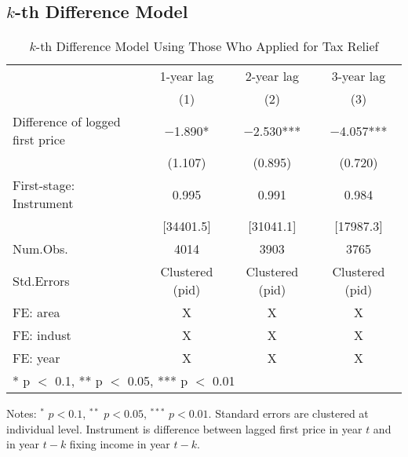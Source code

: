 \documentclass[
  11pt,
  a4paper,
]{article}
\begin{document}
\hypertarget{k-th-difference-model}{%
\subsection{\texorpdfstring{\(k\)-th Difference Model}{k-th Difference Model}}\label{k-th-difference-model}}

\begin{table}

\caption{\label{tab:KdiffElasticity}$k$-th Difference Model Using Those Who Applied for Tax Relief}
\centering
\fontsize{8}{10}\selectfont
\begin{threeparttable}
\begin{tabular}[t]{lccc}
\toprule
\multicolumn{1}{c}{ } & \multicolumn{1}{c}{1-year lag} & \multicolumn{1}{c}{2-year lag} & \multicolumn{1}{c}{3-year lag} \\
\cmidrule(l{3pt}r{3pt}){2-2} \cmidrule(l{3pt}r{3pt}){3-3} \cmidrule(l{3pt}r{3pt}){4-4}
  & (1) & (2) & (3)\\
\midrule
Difference of logged first price & \num{-1.890}* & \num{-2.530}*** & \num{-4.057}***\\
 & (\num{1.107}) & (\num{0.895}) & (\num{0.720})\\
\midrule
First-stage: Instrument & 0.995 & 0.991 & 0.984\\
 & {}[34401.5] & {}[31041.1] & {}[17987.3]\\
Num.Obs. & \num{4014} & \num{3903} & \num{3765}\\
Std.Errors & Clustered (pid) & Clustered (pid) & Clustered (pid)\\
FE: area & X & X & X\\
FE: indust & X & X & X\\
FE: year & X & X & X\\
\bottomrule
\multicolumn{4}{l}{\rule{0pt}{1em}* p $<$ 0.1, ** p $<$ 0.05, *** p $<$ 0.01}\\
\end{tabular}
\begin{tablenotes}
\item Notes: $^{*}$ $p < 0.1$, $^{**}$ $p < 0.05$, $^{***}$ $p < 0.01$. Standard errors are clustered at individual level. Instrument is difference between lagged first price in year $t$ and in year $t - k$ fixing income in year $t - k$.
\end{tablenotes}
\end{threeparttable}
\end{table}

\newpage
\end{document}
